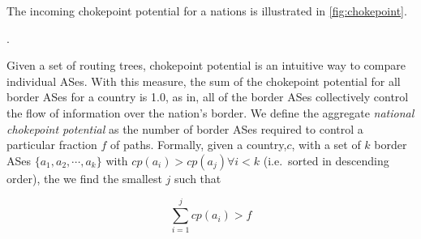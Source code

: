 The incoming chokepoint
potential for a nations is illustrated in \figurename
\ref{fig:chokepoint}.

.

Given a set of routing trees, chokepoint potential is an intuitive way to
compare individual ASes. With this measure, the sum of the chokepoint potential
for all border ASes for a country is 1.0, as in, all of the border ASes
collectively control the flow of information over the nation's border. We
define the aggregate \emph{national chokepoint potential} as the number of
border ASes required to control a particular fraction $f$ of paths. Formally,
given a country,$c$, with a set of $k$ border ASes $\{a_1,a_2,\cdots,a_k\}$ with
$cp(a_i)>cp(a_j) \forall i<k$ (i.e.\ sorted in descending order), the
we find the smallest $j$ such that 

\begin{equation}
  \label{eq:nationalchokepoint}
  \sum_{i=1}^j cp(a_i) > f
\end{equation}

